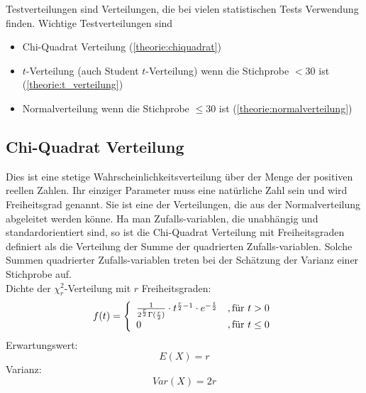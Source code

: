 \begin{tcolorbox}[colback=green!5,colframe=green!40!black,title=Testverteilungen]
Testverteilungen sind Verteilungen, die bei vielen statistischen Tests Verwendung finden. Wichtige Testverteilungen sind
\begin{itemize}
\item Chi-Quadrat Verteilung (\autoref{theorie:chiquadrat})
\item $t$-Verteilung (auch Student $t$-Verteilung) wenn die Stichprobe $<30$ ist (\autoref{theorie:t_verteilung})
\item Normalverteilung wenn die Stichprobe $\leq 30$ ist (\autoref{theorie:normalverteilung})
\end{itemize}
\end{tcolorbox}
\subsection{Chi-Quadrat Verteilung}\label{theorie:chiquadrat}
Dies ist eine stetige Wahrscheinlichkeitsverteilung über der Menge der positiven reellen Zahlen. Ihr einziger Parameter muss eine natürliche Zahl sein und wird Freiheitsgrad genannt. Sie ist eine der Verteilungen, die aus der Normalverteilung abgeleitet werden könne. Ha man Zufalls-variablen, die unabhängig und standardorientiert sind, so ist die Chi-Quadrat Verteilung mit Freiheitsgraden definiert als die Verteilung der Summe der quadrierten Zufalls-variablen. Solche Summen quadrierter Zufalls-variablen treten bei der Schätzung der Varianz einer Stichprobe auf.\\
Dichte der $\chi_r^2$-Verteilung mit $r$ Freiheitsgraden:
\begin{equation}\label{eq:chisqare:1}
f(t)=\left\{\begin{array}{l l} \frac{1}{2^{\frac{r}{2}}\Gamma(\frac{r}{2})}\cdot t^{\frac{r}{2}-1}\cdot e^{-\frac{t}{2}}&, \mbox{für }t > 0 \\ 0 &, \mbox{für } t \leq 0\end{array}\right.
\end{equation}
Erwartungswert:
\begin{equation}
E(X) = r
\end{equation}
Varianz:
\begin{equation}
Var(X) = 2r
\end{equation}
